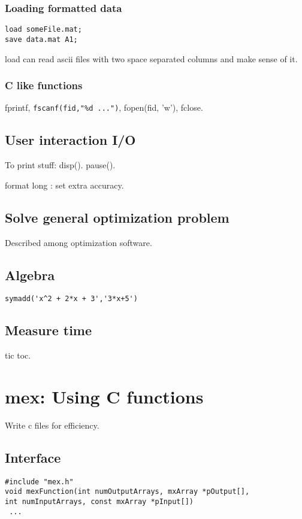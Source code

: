 \subsubsection{Loading formatted data}
\begin{verbatim}
load someFile.mat;
save data.mat A1;
\end{verbatim}
load can read ascii files with two space separated columns and make sense of it.


\subsubsection{C like functions}
fprintf, \verb'fscanf(fid,"%d ...")', fopen(fid, 'w'), fclose.

\subsection{User interaction I/O}
To print stuff: disp(). pause().

format long : set extra accuracy.

\subsection{Solve general optimization problem}
Described among optimization software.

\subsection{Algebra}
\begin{verbatim}
symadd('x^2 + 2*x + 3','3*x+5')
\end{verbatim}

\subsection{Measure time}
tic toc.

\section{mex: Using C functions}
Write c files for efficiency.

\subsection{Interface}
\begin{verbatim}
#include "mex.h"
void mexFunction(int numOutputArrays, mxArray *pOutput[],
int numInputArrays, const mxArray *pInput[])
 ...
\end{verbatim}

